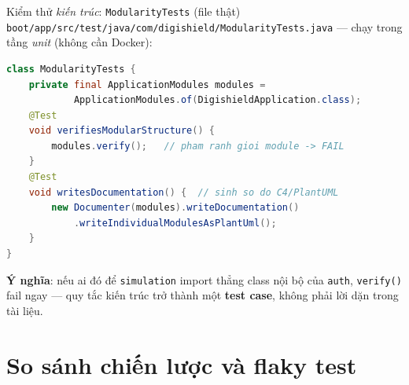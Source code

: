 \documentclass[aspectratio=169,12pt]{beamer}
\begin{document}
\begin{frame}[fragile]{Kiểm thử \emph{kiến trúc}: \texttt{ModularityTests} (file thật)}
  \small\texttt{boot/app/src/test/java/com/digishield/ModularityTests.java} ---
  chạy trong tầng \emph{unit} (không cần Docker):
\begin{lstlisting}[language=Java,style=code,basicstyle=\ttfamily\scriptsize]
class ModularityTests {
    private final ApplicationModules modules =
            ApplicationModules.of(DigishieldApplication.class);
    @Test
    void verifiesModularStructure() {
        modules.verify();   // pham ranh gioi module -> FAIL
    }
    @Test
    void writesDocumentation() {  // sinh so do C4/PlantUML
        new Documenter(modules).writeDocumentation()
            .writeIndividualModulesAsPlantUml();
    }
}
\end{lstlisting}
  {\small \textbf{Ý nghĩa}: nếu ai đó để \texttt{simulation} import thẳng class
  nội bộ của \texttt{auth}, \texttt{verify()} fail ngay --- quy tắc kiến trúc
  trở thành một \textbf{test case}, không phải lời dặn trong tài liệu.}
\end{frame}

\section{So sánh chiến lược và flaky test}
\end{document}
